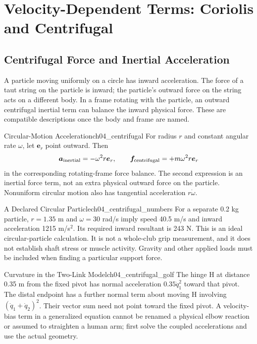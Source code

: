 \section{Velocity-Dependent Terms: Coriolis and Centrifugal}

\subsection*{Centrifugal Force and Inertial Acceleration}

A particle moving uniformly on a circle has inward acceleration. The force of a taut string on the particle is inward; the particle's outward force on the string acts on a different body. In a frame rotating with the particle, an outward centrifugal inertial term can balance the inward physical force. These are compatible descriptions once the body and frame are named.

\begin{definition}{Circular-Motion Acceleration}{ch04_centrifugal}
For radius \(r\) and constant angular rate \(\omega\), let \(\bm e_r\) point outward. Then
\begin{equation}
\bm a_{\rm inertial}=-\omega^2r\bm e_r,
\qquad \bm f_{\rm centrifugal}=+m\omega^2r\bm e_r
\label{eq:ch04_centrifugal_accel}
\end{equation}
in the corresponding rotating-frame force balance. The second expression is an inertial force term, not an extra physical outward force on the particle. Nonuniform circular motion also has tangential acceleration \(r\dot\omega\).
\end{definition}

\begin{example}{A Declared Circular Particle}{ch04_centrifugal_numbers}
For a separate 0.2 kg particle, \(r=1.35\) m and \(\omega=30\) rad/s imply speed 40.5 m/s and inward acceleration 1215 m/s\(^2\). Its required inward resultant is 243 N. This is an ideal circular-particle calculation. It is not a whole-club grip measurement, and it does not establish shaft stress or muscle activity. Gravity and other applied loads must be included when finding a particular support force.
\end{example}

\begin{example}{Curvature in the Two-Link Model}{ch04_centrifugal_golf}
The hinge H at distance 0.35 m from the fixed pivot has normal acceleration \(0.35\dot q_1^2\) toward that pivot. The distal endpoint has a further normal term about moving H involving \((\dot q_1+\dot q_2)^2\). Their vector sum need not point toward the fixed pivot. A velocity-bias term in a generalized equation cannot be renamed a physical elbow reaction or assumed to straighten a human arm; first solve the coupled accelerations and use the actual geometry.
\end{example}

